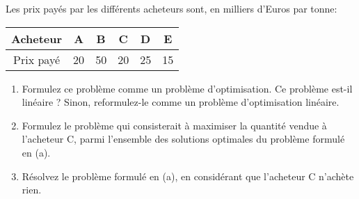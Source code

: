 \begin{enumerate}
    Les prix payés par les différents acheteurs sont, en milliers
    d'Euros par tonne:
    \begin{center}
      \begin{tabular}{|c|c|c|c|c|c|}
        \hline %
        Acheteur & A & B & C & D & E\\
        \hline
        Prix payé & 20 & 50 & 20 & 25 & 15 \\
        \hline
      \end{tabular}
    \end{center}

    \begin{enumerate}
      \item Formulez ce problème comme un problème d'optimisation.
        Ce problème est-il linéaire ?
        Sinon, reformulez-le comme un problème d'optimisation linéaire.

      \item
        Formulez le problème qui consisterait à maximiser la quantité
        vendue à l'acheteur C, parmi l'ensemble des solutions optimales du
        problème formulé en (a).
      \item  Résolvez le problème formulé en (a), en considérant que
        l'acheteur C n'achète rien.

    \end{enumerate}



\end{enumerate}
